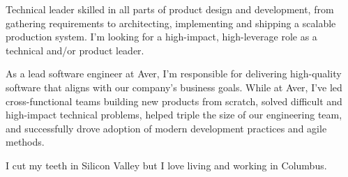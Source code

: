 

\begin{cvparagraph}

Technical leader skilled in all parts of product design and development, from gathering requirements to architecting, implementing and shipping a scalable production system.
I'm looking for a high-impact, high-leverage role as a technical and/or product leader.

As a lead software engineer at Aver, I'm responsible for delivering high-quality software that aligns with our company's business goals.
While at Aver, I've led cross-functional teams building new products from scratch, solved difficult and high-impact technical problems, helped triple the size of our engineering team, and successfully drove adoption of modern development practices and agile methods.

I cut my teeth in Silicon Valley but I love living and working in Columbus.

\end{cvparagraph}
